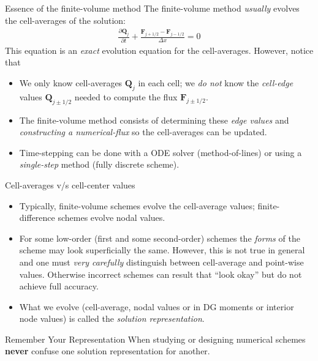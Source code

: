 \documentclass[aspectratio=169]{beamer}
\newcommand{\mypause}{}
\newcommand{\pfrac}[2]{\frac{\partial #1}{\partial #2}}
\newcommand{\mvec}[1]{\mathbf{#1}}
\begin{document}
\begin{frame}{Essence of the finite-volume method}
  \small%
  The finite-volume method \emph{usually} evolves the cell-averages of
  the solution:
  \begin{align*}
    \pfrac{\mvec{Q}_j}{t} + \frac{\mvec{F}_{j+1/2} -\mvec{F}_{j-1/2} }{\Delta x} = 0
  \end{align*}
  This equation is an \emph{exact} evolution equation for the
  cell-averages.\mypause%
  However, notice that
  \begin{itemize}
  \item We only know cell-averages $\mvec{Q}_{j}$ in each cell; we
    \emph{do not} know the \emph{cell-edge} values
    $\mvec{Q}_{j\pm 1/2}$ needed to compute the flux
    $\mvec{F}_{j\pm 1/2}$.%
    \mypause%
  \item The finite-volume method consists of determining these
    \emph{edge values} and \emph{constructing a numerical-flux} so the
    cell-averages can be updated.
  \item Time-stepping can be done with a ODE solver (method-of-lines)
    or using a \emph{single-step} method (fully discrete scheme).
  \end{itemize}
  
\end{frame}

\begin{frame}{Cell-averages v/s cell-center values}
  \small%
  \begin{itemize}
  \item Typically, finite-volume schemes evolve the cell-average
    values; finite-difference schemes evolve nodal values.%
    \mypause%
  \item For some low-order (first and some second-order) schemes the
    \emph{forms} of the scheme may look superficially the
    same. However, this is not true in general and one must \emph{very
      carefully} distinguish between cell-average and point-wise
    values. Otherwise incorrect schemes can result that ``look okay''
    but do not achieve full accuracy.%
    \mypause%
  \item What we evolve (cell-average, nodal values or in DG moments or
    interior node values) is called the \emph{solution
      representation}.
  \end{itemize}
  \begin{block}{Remember Your Representation}
    When studying or designing numerical schemes {\bf never} confuse
    one solution representation for another.
  \end{block}  
\end{frame}
\end{document}
